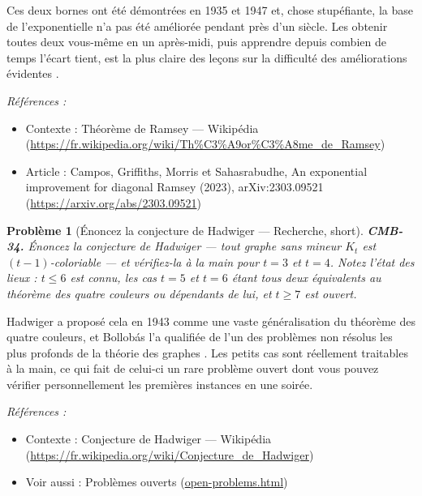 \documentclass[11pt]{article}
\newtheorem{problem}{Problème}
\newenvironment{refs}{\par\small\noindent\emph{Références :}\begin{itemize}\setlength\itemsep{0pt}}{\end{itemize}\normalsize}
\begin{document}
\noindent Ces deux bornes ont été démontrées en 1935 et 1947 et, chose stupéfiante, la base de l'exponentielle n'a pas été améliorée pendant près d'un siècle. Les obtenir toutes deux vous-même en un après-midi, puis apprendre depuis combien de temps l'écart tient, est la plus claire des leçons sur la difficulté des améliorations \og{} évidentes \fg{}.

\begin{refs}
\item Contexte : Théorème de Ramsey --- Wikipédia (\url{https://fr.wikipedia.org/wiki/Th%C3%A9or%C3%A8me_de_Ramsey})
\item Article : Campos, Griffiths, Morris et Sahasrabudhe, \og{} An exponential improvement for diagonal Ramsey \fg{} (2023), arXiv:2303.09521 (\url{https://arxiv.org/abs/2303.09521})
\end{refs}

\bigskip

\begin{problem}[{Énoncez la conjecture de Hadwiger --- Recherche, short}]
\textbf{CMB-34.} Énoncez la conjecture de Hadwiger --- tout graphe sans mineur $ K_{t} $ est $ (t-1) $-coloriable --- et vérifiez-la à la main pour $ t = 3 $ et $ t = 4 $. Notez l'état des lieux : $ t \leq 6 $ est connu, les cas $ t = 5 $ et $ t = 6 $ étant tous deux équivalents au théorème des quatre couleurs ou dépendants de lui, et $ t \geq 7 $ est ouvert.
\end{problem}

\noindent Hadwiger a proposé cela en 1943 comme une vaste généralisation du théorème des quatre couleurs, et Bollobás l'a qualifiée de \og{} l'un des problèmes non résolus les plus profonds de la théorie des graphes \fg{}. Les petits cas sont réellement traitables à la main, ce qui fait de celui-ci un rare problème ouvert dont vous pouvez vérifier personnellement les premières instances en une soirée.

\begin{refs}
\item Contexte : Conjecture de Hadwiger --- Wikipédia (\url{https://fr.wikipedia.org/wiki/Conjecture_de_Hadwiger})
\item Voir aussi : Problèmes ouverts (\url{open-problems.html})
\end{refs}

\bigskip
\end{document}
